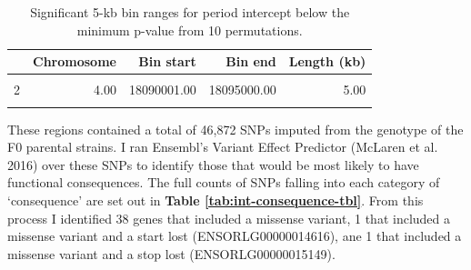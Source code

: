 \documentclass[
]{book}
\begin{document}
\begin{table}
\centering
\begin{tabular}{rrrrr}
  \hline
 & Chromosome & Bin start & Bin end & Length (kb) \\ 
  \hline
\cellcolor{gray!6}{1} & \cellcolor{gray!6}{3.00} & \cellcolor{gray!6}{31880001.00} & \cellcolor{gray!6}{35420000.00} & \cellcolor{gray!6}{3540.00 }\\ 
  2 & 4.00 & 18090001.00 & 18095000.00 & 5.00 \\ 
\cellcolor{gray!6}{  3} & \cellcolor{gray!6}{10.00} & \cellcolor{gray!6}{2995001.00} & \cellcolor{gray!6}{3690000.00} & \cellcolor{gray!6}{695.00 }\\ 
   \hline
\end{tabular}
\caption{Significant 5-kb bin ranges for period intercept below the minimum p-value from 10 permutations.} 
\end{table}

These regions contained a total of 46,872 SNPs imputed from the genotype of the F0 parental strains.
I ran Ensembl's Variant Effect Predictor (McLaren et al. 2016) over these SNPs to identify those that would be most likely to have functional consequences. The full counts of SNPs falling into each category of `consequence' are set out in \textbf{Table \ref{tab:int-consequence-tbl}}. From this process I identified 38 genes that included a missense variant, 1 that included a missense variant and a start lost (ENSORLG00000014616), ane 1 that included a missense variant and a stop lost (ENSORLG00000015149).
\end{document}
